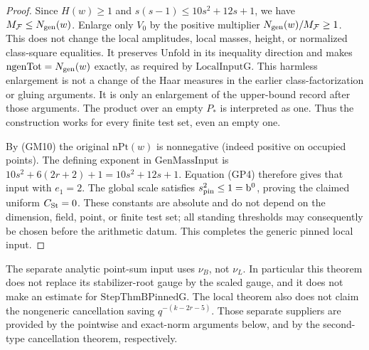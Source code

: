 \begin{proof}
Since \(H(w)\ge1\) and \(s(s-1)\le10s^2+12s+1\),
we have \(M_{\mathcal F}\le N_{\rm gen}(w)\).
Enlarge only \(V_0\) by the positive multiplier
\(N_{\rm gen}(w)/M_{\mathcal F}\ge1\). This does not
change the local amplitudes, local masses, height,
or normalized class-square equalities. It preserves
\(\mathrm{Unfold}\) in its inequality direction and
makes \(\mathrm{ngenTot}=N_{\rm gen}(w)\) exactly,
as required by \(\mathrm{LocalInputG}\).
This harmless enlargement is not a change of the
Haar measures in the earlier class-factorization
or gluing arguments. It is only an enlargement of
the upper-bound record after those arguments.
The product over an empty \(P_*\) is interpreted as
one. Thus the construction works for every finite
test set, even an empty one.

By (GM10) the original \(\mathrm{nPt}(w)\) is
nonnegative (indeed positive on occupied points).
The defining exponent in \(\mathrm{GenMassInput}\)
is \(10s^2+6(2r+2)+1=10s^2+12s+1\).
Equation (GP4) therefore gives that input with
\(e_1=2\). The global scale satisfies
\(s_{\rm pin}^2\le1=\mathrm{b}^{0}\), proving the
claimed uniform \(C_{\rm St}=0\).
These constants are absolute and do not depend
on the dimension, field, point, or finite test set;
all standing thresholds may consequently be chosen
before the arithmetic datum. This completes the
generic pinned local input.
\end{proof}

The separate analytic point-sum input uses
\(\nu_B\), not \(\nu_L\). In particular this theorem
does not replace its stabilizer-root gauge by the
scaled gauge, and it does not make an estimate
for \(\mathrm{StepThmBPinnedG}\). The local theorem
also does not claim the nongeneric cancellation
saving \(q^{-(k-2r-5)}\). Those separate suppliers are
provided by the pointwise and exact-norm arguments below,
and by the second-type cancellation theorem, respectively.
